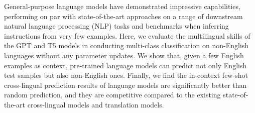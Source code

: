 General-purpose language models have demonstrated impressive capabilities, performing on par with state-of-the-art approaches on a range of downstream natural language processing (NLP) tasks and benchmarks when inferring instructions from very few examples. Here, we evaluate the multilingual skills of the GPT and T5 models in conducting multi-class classification on non-English languages without any parameter updates. We show that, given a few English examples as context, pre-trained language models can predict not only English test samples but also non-English ones. Finally, we find the in-context few-shot cross-lingual prediction results of language models are significantly better than random prediction, and they are competitive compared to the existing state-of-the-art cross-lingual models and translation models.
